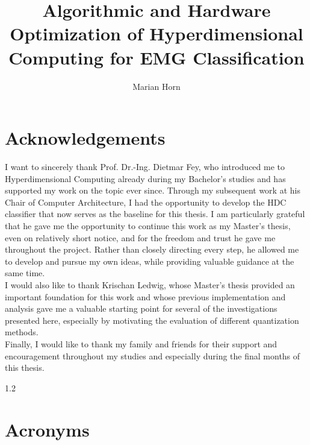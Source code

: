 \documentclass[englishthesis]{i3thesis}
\author{Marian Horn}
\title{Algorithmic and Hardware Optimization of Hyperdimensional Computing for EMG Classification}
\begin{document}


\maketitle



\acresetall

\chapter*{Acknowledgements}

I want to sincerely thank Prof. Dr.-Ing. Dietmar Fey, who introduced me to Hyperdimensional Computing already during my Bachelor's studies and has supported my work on the topic ever since. Through my subsequent work at his Chair of Computer Architecture, I had the opportunity to develop the HDC classifier that now serves as the baseline for this thesis. I am particularly grateful that he gave me the opportunity to continue this work as my Master's thesis, even on relatively short notice, and for the freedom and trust he gave me throughout the project. Rather than closely directing every step, he allowed me to develop and pursue my own ideas, while providing valuable guidance at the same time.\\

I would also like to thank Krischan Ledwig, whose Master's thesis provided an important foundation for this work and whose previous implementation and analysis gave me a valuable starting point for several of the investigations presented here, especially by motivating the evaluation of different quantization methods.\\

Finally, I would like to thank my family and friends for their support and encouragement throughout my studies and especially during the final months of this thesis.
\cleardoublepage

\begin{spacing}{1.2}
\tableofcontents
\end{spacing}
\newpage
\chapter*{Acronyms}
\end{document}
